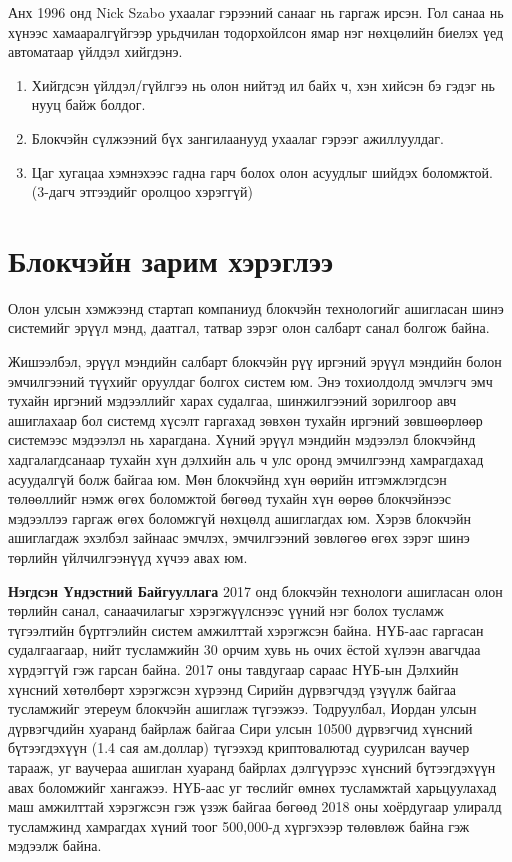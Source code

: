 Анх 1996 онд Nick Szabo  ухаалаг гэрээний санааг нь гаргаж ирсэн. Гол санаа нь хүнээс хамааралгүйгээр урьдчилан тодорхойлсон ямар нэг нөхцөлийн биелэх үед автоматаар үйлдэл хийгдэнэ.

\begin{enumerate}
   \item  Хийгдсэн үйлдэл/гүйлгээ нь олон нийтэд ил байх ч, хэн хийсэн бэ гэдэг нь нууц байж болдог.
   \item  Блокчэйн сүлжээний бүх зангилаанууд ухаалаг гэрээг ажиллуулдаг.
   \item Цаг хугацаа хэмнэхээс гадна гарч болох олон асуудлыг шийдэх боломжтой. (3-дагч этгээдийг оролцоо хэрэггүй)
\end{enumerate}

\section{Блокчэйн зарим хэрэглээ}
Олон улсын хэмжээнд стартап компаниуд блокчэйн технологийг
ашигласан шинэ системийг эрүүл мэнд, даатгал, татвар зэрэг олон салбарт санал болгож байна.

Жишээлбэл, эрүүл мэндийн салбарт блокчэйн рүү иргэний эрүүл
мэндийн болон эмчилгээний түүхийг оруулдаг болгох систем юм. Энэ
тохиолдолд эмчлэгч эмч тухайн иргэний мэдээллийг харах судалгаа, шинжилгээний зорилгоор авч ашиглахаар бол системд хүсэлт гаргахад зөвхөн тухайн иргэний зөвшөөрлөөр системээс мэдээлэл нь харагдана. Хүний эрүүл мэндийн мэдээлэл блокчэйнд хадгалагдсанаар тухайн хүн дэлхийн аль ч улс оронд эмчилгээнд хамрагдахад асуудалгүй болж байгаа юм. Мөн блокчэйнд хүн өөрийн итгэмжлэгдсэн төлөөллийг нэмж өгөх боломжтой бөгөөд тухайн хүн өөрөө блокчэйнээс мэдээллээ гаргаж өгөх боломжгүй нөхцөлд ашиглагдах юм. Хэрэв блокчэйн ашиглагдаж эхэлбэл зайнаас эмчлэх, эмчилгээний зөвлөгөө өгөх зэрэг шинэ төрлийн үйлчилгээнүүд хүчээ авах юм.

\textbf{Нэгдсэн Үндэстний Байгууллага} 2017 онд блокчэйн технологи
ашигласан олон төрлийн санал, санаачилагыг хэрэгжүүлснээс үүний нэг болох тусламж түгээлтийн бүртгэлийн систем амжилттай хэрэгжсэн байна. НҮБ-аас гаргасан судалгаагаар, нийт тусламжийн 30 орчим хувь нь очих ёстой хүлээн авагчдаа хүрдэггүй гэж гарсан байна. 2017 оны тавдугаар сараас НҮБ-ын Дэлхийн хүнсний хөтөлбөрт хэрэгжсэн хүрээнд Сирийн дүрвэгчдэд үзүүлж байгаа тусламжийг этереум блокчэйн ашиглаж түгээжээ. Тодруулбал,
Иордан улсын дүрвэгчдийн хуаранд байрлаж байгаа Сири улсын 10500
дүрвэгчид хүнсний бүтээгдэхүүн (1.4 сая ам.доллар) түгээхэд криптовалютад суурилсан ваучер тарааж, уг ваучераа ашиглан хуаранд байрлах дэлгүүрээс хүнсний бүтээгдэхүүн авах боломжийг хангажээ. НҮБ-аас уг төслийг өмнөх тусламжтай харьцуулахад маш амжилттай хэрэгжсэн гэж үзэж байгаа бөгөөд 2018 оны хоёрдугаар улиралд тусламжинд хамрагдах хүний тоог 500,000-д хүргэхээр төлөвлөж байна гэж мэдээлж байна.

